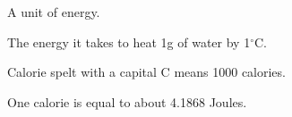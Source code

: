 A unit of energy.
\par
The energy it takes to heat 1g of water by 1$^{\circ}$C.
\par
Calorie spelt with a capital C means 1000 calories.
\par
One calorie is equal to about 4.1868 Joules.